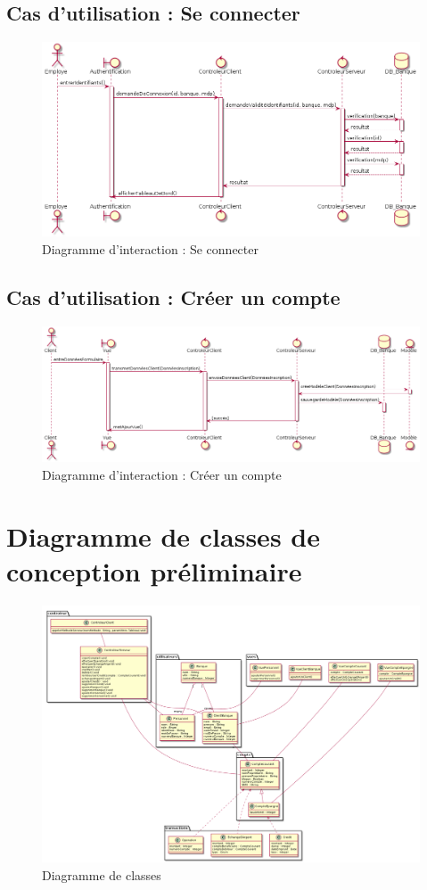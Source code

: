 \subsection{Cas d'utilisation : Se connecter}
\begin{figure}[h!]
\begin{center}
   \caption{Diagramme d'interaction : Se connecter}
   \includegraphics[scale=0.5]{images/seConnecterIR.png}
   \end{center}
\end{figure}
\subsection{Cas d'utilisation : Créer un compte}
\begin{figure}[h!]
\begin{center}
   \caption{Diagramme d'interaction : Créer un compte}
   \includegraphics[scale=0.4]{images/SInscrire.png}
   \end{center}
\end{figure}
\newpage
\section{Diagramme de classes de conception préliminaire}
\begin{figure}[h!]
\begin{center}
   \caption{Diagramme de classes}
   \includegraphics[scale=0.3, angle=90]{images/diagrammeClasses.png}
   \end{center}
\end{figure}
